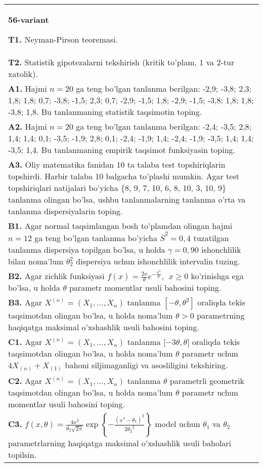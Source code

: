 \documentclass{article}
\begin{document}
\begin{tabular}{m{17cm}}
\textbf{56-variant}
\newline

\textbf{T1.} 
Neyman-Pirson teoremasi.
\\
\textbf{T2.} 
Statistik gipotezalarni tekshirish (kritik to'plam, 1 va 2-tur xatolik).
\\
\textbf{A1.} 
Hajmi \(n = 20\) ga teng bo'lgan tanlanma berilgan: -2,9; -3,8; 2,3; 1,8; 1,8; 0,7; -3,8; -1,5; 2,3; 0,7; -2,9; -1,5; 1,8; -2,9; -1,5; -3,8; 1,8; 1,8; -3,8; 1,8. Bu tanlanmaning statistik taqsimotin toping.
\\
\textbf{A2.} 
Hajmi \(n = 20\) ga teng bo'lgan tanlanma berilgan: -2,4; -3,5; 2,8; 1,4; 1,4; 0,1; -3,5; -1,9; 2,8; 0,1; -2,4; -1,9; 1,4; -2,4; -1,9; -3,5; 1,4; 1,4; -3,5; 1,4. Bu tanlanmaning empirik taqsimot funksiyasin toping.
\\
\textbf{A3.} 
Oliy matematika fanidan 10 ta talaba test topshiriqlarin topshirdi. Harbir talaba 10 balgacha to'plashi mumkin. Agar test topshiriqlari natijalari bo'yicha \{8, 9, 7, 10, 6, 8, 10, 3, 10, 9\} tanlanma olingan bo'lsa, ushbu tanlanmalarning tanlanma o'rta va tanlanma dispersiyalarin toping.
\\
\textbf{B1.} 
Agar normal taqsimlangan bosh to'plamdan olingan hajmi \(n = 12\) ga teng bo'lgan tanlanma bo'yicha \({\overline{S}}^{2} = 0,4\) tuzatilgan tanlanma dispersiya topilgan bo'lsa, u holda \(\gamma = 0,90\) ishonchlilik bilan noma'lum \(\theta_{2}^{2}\) dispersiya uchun ishonchlilik intervalin tuzing.
\\
\textbf{B2.} 
Agar zichlik funksiyasi \(f(x) = \frac{2x}{\theta}e^{- \frac{x^{2}}{\theta}},\ \ x \geq 0\) ko'rinishga ega bo'lsa, u holda \(\theta\) parametr momentlar usuli bahosini toping.
\\
\textbf{B3.} 
Agar \(X^{(n)} = \left( X_{1},...,X_{n} \right)\) tanlanma \(\left\lbrack - \theta,\theta^{2} \right\rbrack\) oraliqda tekis taqsimotdan olingan bo'lsa, u holda noma'lum \(\theta > 0\) parametrning haqiqatga maksimal o'xshashlik usuli bahosini toping.
\\
\textbf{C1.} 
Agar \(X^{(n)} = \left( X_{1},...,X_{n} \right)\) tanlanma \(\lbrack - 3\theta,\theta\rbrack\) oraliqda tekis taqsimotdan olingan bo'lsa, u holda noma'lum \(\theta\) parametr uchun \(4X_{(n)} + X_{(1)}\) bahoni siljimaganligi va asosliligini tekshiring.
\\
\textbf{C2.} 
Agar \(X^{(n)} = \left( X_{1},...,X_{n} \right)\) tanlanma \(\theta\) parametrli geometrik taqsimotdan olingan bo'lsa, u holda noma'lum \(\theta\) parametr uchun momentlar usuli bahosini toping.
\\
\textbf{C3.} 
\(f(x,\theta) = \frac{4x^{3}}{\theta_{2}\sqrt{2\pi}}\exp\left\{ - \frac{\left( x^{4} - \theta_{1} \right)^{2}}{2{\theta_{2}}^{2}} \right\}\) model uchun \(\theta_{1}\) va \(\theta_{2}\) parametrlarning haqiqatga maksimal o'xshashlik usuli baholari topilsin.
\\

\end{tabular}
\vspace{1cm}
\end{document}
